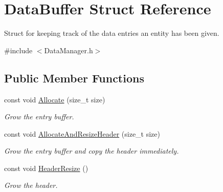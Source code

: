 \hypertarget{struct_data_buffer}{}\section{Data\+Buffer Struct Reference}
\label{struct_data_buffer}


Struct for keeping track of the data entries an entity has been given.  




{\ttfamily \#include $<$Data\+Manager.\+h$>$}

\subsection*{Public Member Functions}
\begin{DoxyCompactItemize}
\item 
\mbox{\label{struct_data_buffer_a7a43566e9225aac2d8d0fd5cba9d048e}} 
const void \hyperlink{struct_data_buffer_a7a43566e9225aac2d8d0fd5cba9d048e}{Allocate} (size\+\_\+t size)
\begin{DoxyCompactList}\small\item\em Grow the entry buffer. \end{DoxyCompactList}\item 
\mbox{\label{struct_data_buffer_a7be60ad0927d8a2188d02cc1307e452b}} 
const void \hyperlink{struct_data_buffer_a7be60ad0927d8a2188d02cc1307e452b}{Allocate\+And\+Resize\+Header} (size\+\_\+t size)
\begin{DoxyCompactList}\small\item\em Grow the entry buffer and copy the header immediately. \end{DoxyCompactList}\item 
\mbox{\label{struct_data_buffer_a3678452dd076f51251237a021a264c75}} 
const void \hyperlink{struct_data_buffer_a3678452dd076f51251237a021a264c75}{Header\+Resize} ()
\begin{DoxyCompactList}\small\item\em Grow the header. \end{DoxyCompactList}\end{DoxyCompactItemize}
